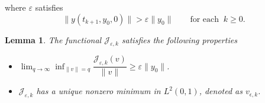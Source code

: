 \documentclass[sn-mathphys]{sn-jnl}
\newtheorem{lemma}[theorem]{Lemma}
\begin{document}
where $\varepsilon$ satisfies 
\begin{equation}\label{choice}
    \|y(t_{k+1},y_0,0)\| > \varepsilon\|y_0\| \qquad \text{for each}\;\; k \geq 0.
\end{equation} 
\begin{lemma}\label{coerv2}
    The functional \(\mathcal{J}_{\varepsilon,k}\) satisfies the following properties
    \begin{itemize}
        \item[(i)] \(\displaystyle{\lim_{q \to \infty}} \displaystyle{\inf_{\|v\|=q}} \dfrac{\mathcal{J}_{\varepsilon,k}(v)}{\|v\|} \geq \varepsilon\|y_0\|\).\\
        \item[(ii)] \(\mathcal{J}_{\varepsilon,k}\) has a unique nonzero minimum in $L^2(0,1)$, denoted as \(v_{\epsilon,k}\).
    \end{itemize}
\end{lemma}
\end{document}
